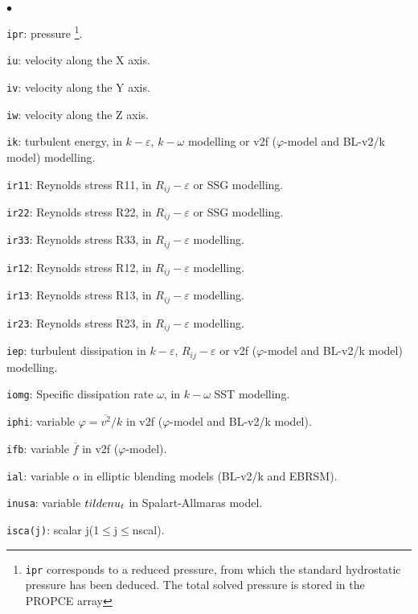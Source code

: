 {{{\begin{list}{$\bullet$}{}
\item \texttt{ipr}: pressure
\footnote{\texttt{ipr} corresponds to a
reduced pressure, from which the standard hydrostatic pressure has been
deduced. The total solved pressure is stored in the PROPCE array}.
\item \texttt{iu}: velocity along the X axis.
\item \texttt{iv}: velocity along the Y axis.
\item \texttt{iw}: velocity along the Z axis.
\item \texttt{ik}: turbulent energy, in $k-\varepsilon$,
$k-\omega$ modelling or v2f ($\varphi$-model and BL-v2/k model) modelling.
\item \texttt{ir11}: Reynolds stress R11, in
      $R_{ij}-\varepsilon$ or SSG modelling.
\item \texttt{ir22}: Reynolds stress R22, in
      $R_{ij}-\varepsilon$ or SSG modelling.
\item \texttt{ir33}: Reynolds stress R33, in
      $R_{ij}-\varepsilon$ modelling.
\item \texttt{ir12}: Reynolds stress R12, in
      $R_{ij}-\varepsilon$ modelling.
\item \texttt{ir13}: Reynolds stress R13, in
      $R_{ij}-\varepsilon$ modelling.
\item \texttt{ir23}: Reynolds stress R23, in
      $R_{ij}-\varepsilon$ modelling.
\item \texttt{iep}: turbulent dissipation in $k-\varepsilon$,
$R_{ij}-\varepsilon$ or v2f ($\varphi$-model and BL-v2/k model) modelling.
\item \texttt{iomg}: Specific dissipation rate $\omega$, in
$k-\omega$ SST modelling.
\item \texttt{iphi}: variable $\varphi=\overline{v^2}/k$ in v2f ($\varphi$-model and BL-v2/k model).
\item \texttt{ifb}: variable $\overline{f}$ in v2f ($\varphi$-model).
\item \texttt{ial}: variable $\alpha$ in elliptic blending models (BL-v2/k and EBRSM).
\item \texttt{inusa}: variable $\\tilde{nu}_t$ in Spalart-Allmaras model.
\item \texttt{isca(j)}: scalar j(1$\leqslant$j$\leqslant$nscal).
\end{list}

}}}
